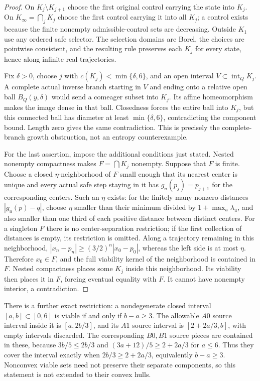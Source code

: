 \documentclass[11pt,reqno]{amsart}
\numberwithin{equation}{section}
\theoremstyle{definition}
\newcommand{\intr}{\operatorname{int}}
\begin{document}
\begin{proof}
On $K_j\setminus K_{j+1}$ choose the first original control
carrying the state into $K_j$. On $K_\infty=\bigcap_jK_j$
choose the first control carrying it into all $K_j$; a control
exists because the finite nonempty admissible-control sets are
decreasing. Outside $K_1$ use any ordered safe selector.
The selection domains are Borel, the choices are pointwise
consistent, and the resulting rule preserves each $K_j$ for
every state, hence along infinite real trajectories.

Fix $\delta>0$, choose $j$ with
$c(K_j)<\min\{\delta,6\}$, and an open interval
$V\subset\intr_QK_j$. A complete actual inverse branch starting
in $V$ and ending onto a relative open ball $B_Q(y,\delta)$
would send a comeager subset into $K_j$. Its affine homeomorphism
makes the image dense in that ball. Closedness forces the entire
ball into $K_j$, but this connected ball has diameter at least
$\min\{\delta,6\}$, contradicting the component bound.
Length zero gives the same contradiction. This is precisely the
complete-branch growth obstruction, not an entropy counterexample.

For the last assertion, impose the additional conditions just stated.
Nested nonempty compactness makes $F=\bigcap K_j$ nonempty.
Suppose that $F$ is finite. Choose
a closed $\eta$-neighborhood of $F$ small enough that its
nearest center is unique and every actual safe step staying in it
has $g_u(p_j)=p_{j+1}$ for the corresponding centers. Such an
$\eta$ exists: for the finitely many nonzero distances
$|g_u(p)-q|$, choose $\eta$ smaller than their minimum divided
by $1+\max_u\lambda_u$, and also smaller than one third of each positive distance between
distinct centers. For a singleton $F$ there is no center-separation
restriction; if the first collection of distances is empty, its
restriction is omitted. Along a trajectory
remaining in this neighborhood,
$|x_{n}-p_n|\ge(3/2)^n|x_0-p_0|$, whereas the left side is
at most $\eta$. Therefore $x_0\in F$, and the full viability
kernel of the neighborhood is contained in $F$. Nested compactness
places some $K_j$ inside this neighborhood. Its viability then
places it in $F$, forcing eventual equality with $F$. It cannot
have nonempty interior, a contradiction.
\end{proof}

There is a further exact restriction: a nondegenerate closed interval
$[a,b]\subset[0,6]$ is viable if and only if $b-a\ge3$.
The allowable $A0$ source interval inside it is
$[a,2b/3]$, and its $A1$ source interval is
$[2+2a/3,b]$, with empty intervals discarded. The corresponding
$B0,B1$ source pieces are contained in these, because
$3b/5\le2b/3$ and $(3a+12)/5\ge2+2a/3$ for $a\le6$.
Thus they cover the interval exactly when
$2b/3\ge2+2a/3$, equivalently $b-a\ge3$.
Nonconvex viable sets need not preserve their separate components,
so this statement is not extended to their convex hulls.
\end{document}
